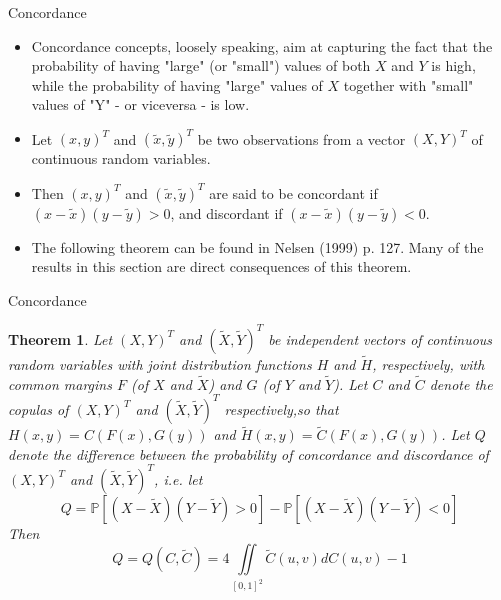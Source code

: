 \documentclass[11pt]{beamer}
\theoremstyle{plain}
\newtheorem{thm}{Theorem}[section]
\theoremstyle{definition}
\theoremstyle{remark}
\begin{document}
\begin{frame}{Concordance}
   \begin{itemize}
      \item   				  						  
		Concordance concepts, loosely speaking, aim at capturing the fact that the 
		probability of having "large" (or "small") values of both $X$ and $Y$ is high, while 
		the probability of having "large" values of $X$ together with "small" values of "Y" 
		- or viceversa - is low.
	  \item 
	  	Let $(x, y)^T$ and $(\tilde x, \tilde y)^T$ be two observations from a vector $(X, Y 
	  	)^T$ of continuous random variables. 
	  \item		  	
	  	Then $(x, y)^T$ and $(\tilde x, \tilde y)^T$ 
	  	are said to be concordant if $(x - \tilde x)(y - \tilde y) > 0$, and discordant if $
	  	(x-\tilde x)(y-\tilde y) < 0$.
	  \item 
		The following theorem can be found in Nelsen (1999) p. 127. Many of the results in 	
		this section are direct consequences of this theorem.
   \end{itemize}
\end{frame}
%
\begin{frame}{Concordance}
	\begin{thm}
	Let $(X, Y )^T$ and $(\tilde X, \tilde Y )^T$ be independent vectors of continuous random variables with joint distribution functions $H$ 
	and $\tilde H$, respectively, with common margins $F$ (of $X$ and $\tilde X$) and $G$ (of $Y$ and $\tilde Y$). Let $C$ and $\tilde C
	$ denote the copulas of $(X, Y )^T$ and $(\tilde X, \tilde Y )^T$ respectively,so that $H(x,y)=C(F(x),G(y))$ and $\tilde H(x,y)= \tilde 
	C(F(x),G(y))$. Let $Q$ denote the difference between the probability of concordance and discordance of $(X, Y )^T$ and $(\tilde X, 
	\tilde Y )^T$,  i.e. let
	\begin{equation}
    	Q=\mathbb{P}[(X-\tilde X)(Y-\tilde Y) > 0]-\mathbb{P}[(X-\tilde X)(Y-\tilde Y) < 0] 
	\end{equation}	
	Then
	\begin{equation}
			Q=Q(C, \tilde C) = 4 \iint\limits_{[0,1]^2} \tilde C (u,v) dC(u,v) -1
	\end{equation}
    \end{thm}
\end{frame}
\end{document}
